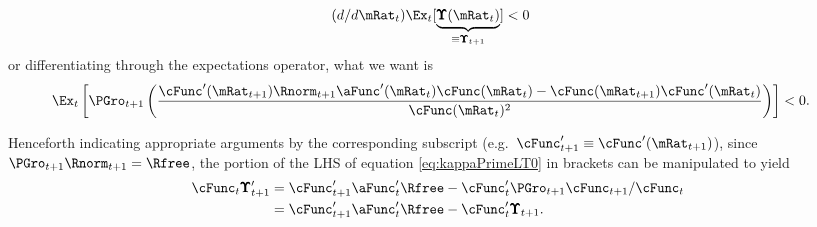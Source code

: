 \documentclass[BufferStockTheory]{subfiles}
\begin{document}
\begin{equation}\begin{gathered}\begin{aligned}
  (d/d\mRat_{t})\Ex_{t}[\underbrace{\pmb{\Upsilon}(\mRat_{t})}_{\equiv \pmb{\Upsilon}_{t+1}}]  & < 0  \nonumber
\end{aligned}\end{gathered}\end{equation}
or differentiating through the expectations operator, what we want is
\begin{equation}\begin{gathered}\begin{aligned}
  \Ex_{t}\left[\PGro_{t+1} \left(\frac{\cFunc^{\prime}(\mRat_{t+1})\Rnorm_{t+1}\aFunc^{\prime}(\mRat_{t})\cFunc(\mRat_{t})-\cFunc(\mRat_{t+1})\cFunc^{\prime}(\mRat_{t})}{\cFunc(\mRat_{t})^{2}}\right)\right]  & < 0 \label{eq:kappaPrimeLT0}.
\end{aligned}\end{gathered}\end{equation}

Henceforth indicating appropriate arguments by the corresponding
subscript (e.g.\ $\cFunc_{t+1}^{\prime} \equiv \cFunc^{\prime}(\mRat_{t+1})$), since
$\PGro_{t+1}\Rnorm_{t+1}=\Rfree$, the portion of the LHS of equation \eqref{eq:kappaPrimeLT0} in brackets can be manipulated to yield
\begin{equation}\begin{gathered}\begin{aligned}
  \cFunc_{t} \pmb{\Upsilon}^{\prime}_{t+1}  & = \cFunc^{\prime}_{t+1}\aFunc^{\prime}_{t}\Rfree-\cFunc^{\prime}_{t} \PGro_{t+1} \cFunc_{t+1}/\cFunc_{t} \nonumber
  \\  & = \cFunc^{\prime}_{t+1}\aFunc^{\prime}_{t}\Rfree-\cFunc^{\prime}_{t} \pmb{\Upsilon}_{t+1} \label{eq:cPrimek}
        .
\end{aligned}\end{gathered}\end{equation}
\end{document}
